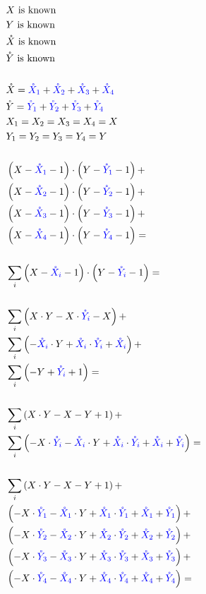 \documentclass[a4paper]{article}
\newcommand{\Xp}[1]{X_{#1}}
\newcommand{\Xn}[1]{{\color{blue}\mathring{X}_{#1}}}
\newcommand{\Yp}[1]{Y_{#1}}
\newcommand{\Yn}[1]{{\color{blue}\mathring{Y}_{#1}}}
\begin{document}
\begin{align*}
  &X \text{ is known} \\
  &Y \text{ is known} \\
  &\mathring{X} \text{ is known} \\
  &\mathring{Y} \text{ is known} \\
%
  &{} \\
  &\mathring{X} = \Xn{1} + \Xn{2} + \Xn{3} + \Xn{4} \\ 
  &\mathring{Y} = \Yn{1} + \Yn{2} + \Yn{3} + \Yn{4} \\ 
  &\Xp{1} = \Xp{2} = \Xp{3} = \Xp{4} = X \\
  &\Yp{1} = \Yp{2} = \Yp{3} = \Yp{4} = Y \\
%
  &{} \\
  &\left( X - \Xn{1} - 1 \right)   \cdot  \left( Y - \Yn{1} - 1 \right) +   \\
  &\left( X - \Xn{2} - 1 \right)   \cdot  \left( Y - \Yn{2} - 1 \right) +   \\
  &\left( X - \Xn{3} - 1 \right)   \cdot  \left( Y - \Yn{3} - 1 \right) +   \\
  &\left( X - \Xn{4} - 1 \right)   \cdot  \left( Y - \Yn{4} - 1 \right) =   \\
%
  &{} \\
  &\sum_{i} \left( X - \Xn{i} - 1 \right)   \cdot  \left( Y - \Yn{i} - 1 \right) = \\
%
  &{} \\
  &\sum_{i} \left( X \cdot Y - X \cdot \Yn{i} - X \right) + \\
  &\sum_{i} \left( - \Xn{i} \cdot Y + \Xn{i} \cdot \Yn{i} + \Xn{i} \right) + \\
  &\sum_{i} \left( - Y + \Yn{i} + 1 \right) = \\
%
  &{} \\
  &\sum_{i} \left( X \cdot Y - X - Y + 1 \right) + \\
  &\sum_{i} \left( - X \cdot \Yn{i} - \Xn{i} \cdot Y + \Xn{i} \cdot \Yn{i} + \Xn{i}  + \Yn{i} \right) = \\
%
  &{} \\
  &\sum_{i} \left( X \cdot Y - X - Y + 1 \right) + \\
  &\left( - X \cdot \Yn{1} - \Xn{1} \cdot Y + \Xn{1} \cdot \Yn{1} + \Xn{1}  + \Yn{1} \right) + \\
  &\left( - X \cdot \Yn{2} - \Xn{2} \cdot Y + \Xn{2} \cdot \Yn{2} + \Xn{2}  + \Yn{2} \right) + \\
  &\left( - X \cdot \Yn{3} - \Xn{3} \cdot Y + \Xn{3} \cdot \Yn{3} + \Xn{3}  + \Yn{3} \right) + \\
  &\left( - X \cdot \Yn{4} - \Xn{4} \cdot Y + \Xn{4} \cdot \Yn{4} + \Xn{4}  + \Yn{4} \right) =
\end{align*}
\end{document}

